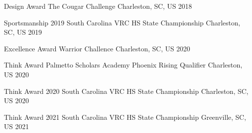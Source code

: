 

\begin{cvhonors}

  \cvhonor
    {Design Award} %
    {The Cougar Challenge} %
    {Charleston, SC, US} %
    {2018} %

  \cvhonor
    {Sportsmanship} %
    {2019 South Carolina VRC HS State Championship} %
    {Charleston, SC, US} %
    {2019} %

  \cvhonor
    {Excellence Award} %
    {Warrior Challence} %
    {Charleston, SC, US} %
    {2020} %

  \cvhonor
    {Think Award} %
    {Palmetto Scholars Academy Phoenix Rising Qualifier} %
    {Charleston, US} %
    {2020} %

  \cvhonor
    {Think Award} %
    {2020 South Carolina VRC HS State Championship} %
    {Charleston, SC, US} %
    {2020} %

  \cvhonor
    {Think Award} %
    {2021 South Carolina VRC HS State Championship} %
    {Greenville, SC, US} %
    {2021} %

\end{cvhonors}
